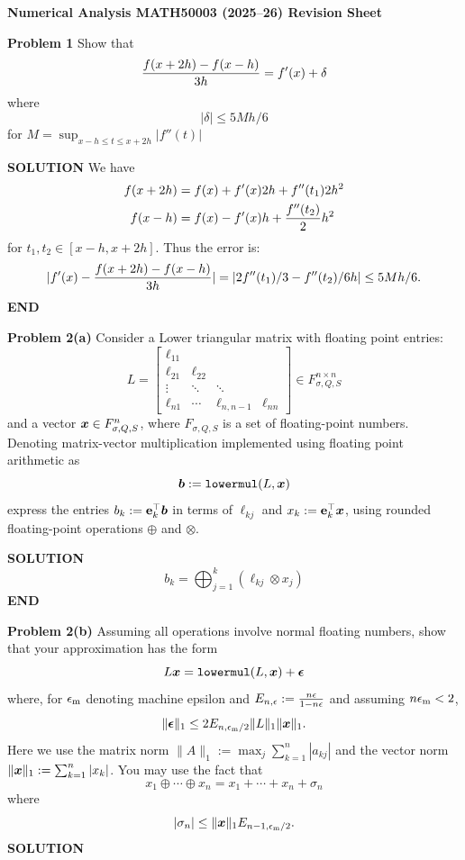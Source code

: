 \documentclass[12pt,a4paper]{article}
\def\endash{–}
\def\x{ {\vc x} }
\def\b{ {\vc b} }
\begin{document}
\textbf{Numerical Analysis MATH50003 (2025\ensuremath{\endash}26) Revision Sheet}

\textbf{Problem 1} Show that
\[
{f(x+2h) - f(x-h) \over 3 h} = f'(x) + \ensuremath{\delta}
\]
where
\[
|\ensuremath{\delta}| \ensuremath{\leq} 5Mh/6
\]
for $M = \sup_{x-h \ensuremath{\leq} t \ensuremath{\leq} x+2h}|f''(t)|$

\textbf{SOLUTION} We have
\begin{align*}
f(x+2h) &= f(x) + f'(x)2h + f''(t_1) 2h^2 \\
f(x-h) &= f(x) - f'(x)h + {f''(t_2) \over 2} h^2
\end{align*}
for $t_1,t_2 \in [x-h,x+2h]$. Thus the error is:
\[
|f'(x) - {f(x+2h) - f(x-h) \over 3h}| = |{2f''(t_1)/3 - f''(t_2)/6} h| \leq 5Mh/6.
\]
\textbf{END}

\textbf{Problem 2(a)} Consider a Lower triangular matrix with floating point entries:
\[
L = \begin{bmatrix}
\ensuremath{\ell}_{11} \\
 \ensuremath{\ell}_{21} & \ensuremath{\ell}_{22} \\
 \ensuremath{\vdots} & \ensuremath{\ddots} & \ensuremath{\ddots} \\
 \ensuremath{\ell}_{n1} & \ensuremath{\cdots} & \ensuremath{\ell}_{n,n-1} & \ensuremath{\ell}_{nn}
 \end{bmatrix} \ensuremath{\in} F_{\ensuremath{\sigma},Q,S}^{n \ensuremath{\times} n}
\]
and a vector $\ensuremath{\bm{\x}} \in F_{\ensuremath{\sigma},Q,S}^{n}$, where $F_{\ensuremath{\sigma},Q,S}$ is a set of floating-point numbers. Denoting matrix-vector multiplication implemented using floating point arithmetic as
\[
\ensuremath{\bm{\b}} := {\tt lowermul}(L,\ensuremath{\bm{\x}})
\]
express the entries $b_k := {\bf e}_k^\ensuremath{\top} \ensuremath{\bm{\b}}$  in terms of $\ensuremath{\ell}_{kj}$ and $x_k := {\bf e}_k^\ensuremath{\top} \ensuremath{\bm{\x}}$,  using rounded floating-point operations $\ensuremath{\oplus}$ and $\ensuremath{\otimes}$.

\textbf{SOLUTION}
\[
b_k = \ensuremath{\bigoplus}_{j=1}^k (\ensuremath{\ell}_{kj} \ensuremath{\otimes} x_j)
\]
\textbf{END}

\textbf{Problem 2(b)} Assuming all operations involve normal floating numbers, show that your approximation has the form
\[
L \ensuremath{\bm{\x}} = {\tt lowermul}(L, \ensuremath{\bm{\x}}) + \ensuremath{\bm{\epsilon}}
\]
where, for $\ensuremath{\epsilon}_{\rm m}$ denoting machine epsilon and $E_{n,\ensuremath{\epsilon}}:= {n \ensuremath{\epsilon} \over 1-n\ensuremath{\epsilon}}$ and assuming $n \ensuremath{\epsilon}_{\rm m} < 2$,
\[
\| \ensuremath{\bm{\epsilon}} \|_1 \ensuremath{\leq}   2E_{n,\ensuremath{\epsilon}_{\rm m}/2}   \|L\|_1 \| \ensuremath{\bm{\x}} \|_1.
\]
Here we use  the matrix norm $\| A \|_1 := \max_j \ensuremath{\sum}_{k=1}^n |a_{kj}|$ and the vector norm $\| \ensuremath{\bm{\x}} \|_1 := \ensuremath{\sum}_{k=1}^n |x_k|$. You may use the fact that
\[
x_1 \ensuremath{\oplus} \ensuremath{\cdots} \ensuremath{\oplus} x_n = x_1 +  \ensuremath{\cdots} + x_n + \ensuremath{\sigma}_n
\]
where
\[
|\ensuremath{\sigma}_n| \ensuremath{\leq} \| \ensuremath{\bm{\x}} \|_1 E_{n-1,\ensuremath{\epsilon}_{\rm m}/2}.
\]
\textbf{SOLUTION}
\end{document}

